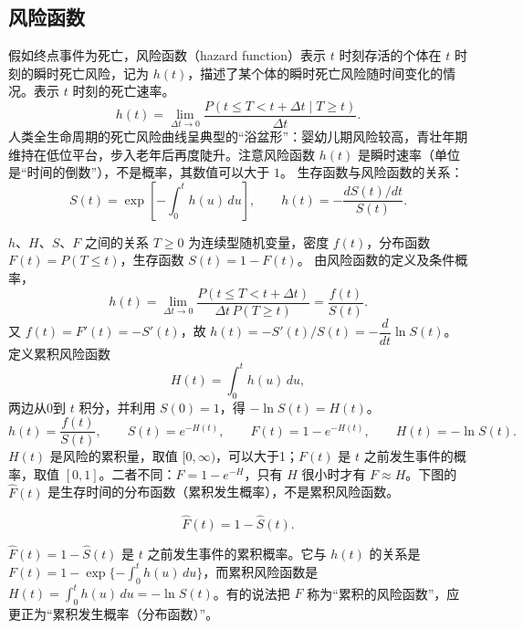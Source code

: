 \subsection{风险函数}
假如终点事件为死亡，风险函数（hazard function）表示 $t$ 时刻存活的个体在 $t$ 时刻的瞬时死亡风险，记为 $h(t)$，描述了某个体的瞬时死亡风险随时间变化的情况。表示 $t$ 时刻的死亡速率。
\[
h(t)=\lim_{\Delta t\to0}\frac{P(t\le T<t+\Delta t\mid T\ge t)}{\Delta t}.
\]
人类全生命周期的死亡风险曲线呈典型的“浴盆形”：婴幼儿期风险较高，青壮年期维持在低位平台，步入老年后再度陡升。注意风险函数 $h(t)$ 是瞬时速率（单位是“时间的倒数”），不是概率，其数值可以大于 $1$。
生存函数与风险函数的关系：
\[
S(t)=\exp\left[-\int_0^th(u)\,du\right],\qquad
h(t)=-\frac{dS(t)/dt}{S(t)}.
\]
\begin{derivation}{$h$、$H$、$S$、$F$ 之间的关系}
$T\ge0$ 为连续型随机变量，密度 $f(t)$，分布函数 $F(t)=P(T\le t)$，生存函数 $S(t)=1-F(t)$。
由风险函数的定义及条件概率，
\[
h(t)=\lim_{\Delta t\to0}\frac{P(t\le T<t+\Delta t)}{\Delta t\,P(T\ge t)}=\frac{f(t)}{S(t)}.
\]
又 $f(t)=F'(t)=-S'(t)$，故 $h(t)=-S'(t)/S(t)=-\dfrac{d}{dt}\ln S(t)$。定义累积风险函数
\[
H(t)=\int_0^th(u)\,du ,
\]
两边从0到 $t$ 积分，并利用 $S(0)=1$，得 $-\ln S(t)=H(t)$。
\[
h(t)=\frac{f(t)}{S(t)},\qquad S(t)=e^{-H(t)},\qquad F(t)=1-e^{-H(t)},\qquad H(t)=-\ln S(t).
\]
$H(t)$ 是风险的累积量，取值 $[0,\infty)$，可以大于1；$F(t)$ 是 $t$ 之前发生事件的概率，取值 $[0,1]$。二者不同：$F=1-e^{-H}$，只有 $H$ 很小时才有 $F\approx H$。下图的 $\widehat F(t)$ 是生存时间的分布函数（累积发生概率），不是累积风险函数。
\end{derivation}
\[
\widehat F(t)=1-\widehat S(t).
\]
\begin{annotation}
$\widehat F(t)=1-\widehat S(t)$ 是 $t$ 之前发生事件的累积概率。它与 $h(t)$ 的关系是 $F(t)=1-\exp\{-\int_0^th(u)\,du\}$，而累积风险函数是 $H(t)=\int_0^th(u)\,du=-\ln S(t)$。有的说法把 $F$ 称为“累积的风险函数”，应更正为“累积发生概率（分布函数）”。
\end{annotation}
